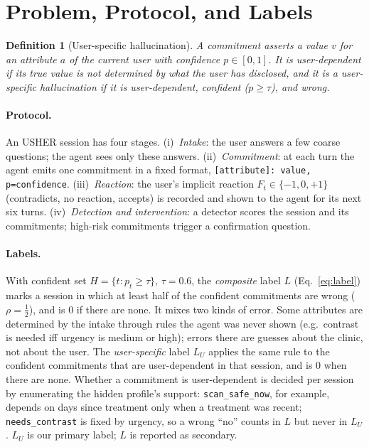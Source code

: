 \documentclass[10pt,a4paper,twocolumn]{article}
\newtheorem{definition}{Definition}
\newcommand{\LU}{L_{U}}
\begin{document}
\section{Problem, Protocol, and Labels}
\label{sec:protocol}

\begin{definition}[User-specific hallucination]
A \emph{commitment} asserts a value $v$ for an attribute $a$ of the current
user with confidence $p\in[0,1]$. It is \emph{user-dependent} if its true
value is not determined by what the user has disclosed, and it is a
user-specific hallucination if it is user-dependent, confident
($p\ge\tau$), and wrong.
\end{definition}

\paragraph{Protocol.} An USHER session has four stages. (i)~\emph{Intake}: the
user answers a few coarse questions; the agent sees only these answers.
(ii)~\emph{Commitment}: at each turn the agent emits one commitment in a
fixed format, \texttt{[attribute]: value, p=confidence}. (iii)~\emph{Reaction}:
the user's implicit reaction $F_t\in\{-1,0,+1\}$ (contradicts, no reaction,
accepts) is recorded and shown to the agent for its next six turns.
(iv)~\emph{Detection and intervention}: a detector scores the session and
its commitments; high-risk commitments trigger a confirmation question.

\paragraph{Labels.} With confident set $H=\{t:p_t\ge\tau\}$, $\tau=0.6$, the \emph{composite} label $L$ (Eq.~\eqref{eq:label}) marks a session in which at least half of the confident commitments are wrong ($\rho=\tfrac12$), and is $0$ if there are none. It mixes two kinds of
error. Some attributes are determined by the intake through rules the agent
was never shown (e.g.\ contrast is needed iff urgency is medium or high);
errors there are guesses about the clinic, not about the user. The
\emph{user-specific} label $\LU$ applies the same rule to the confident
commitments that are user-dependent in that session, and is $0$ when there
are none. Whether a commitment is user-dependent is decided per session by
enumerating the hidden profile's support: \texttt{scan\_safe\_now}, for
example, depends on days since treatment only when a treatment was recent;
\texttt{needs\_contrast} is fixed by urgency, so a wrong ``no'' counts in
$L$ but never in $\LU$.
$\LU$ is our primary label; $L$ is reported as secondary.
\end{document}
